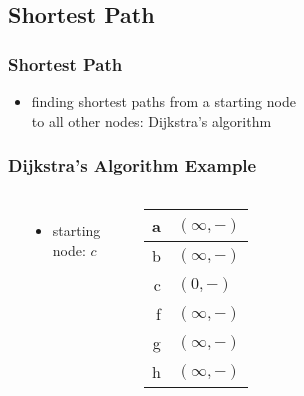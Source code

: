 \documentclass[dvipsnames]{beamer}
\begin{document}
\subsection{Shortest Path}

\begin{frame}
  \frametitle{Shortest Path}

  \begin{itemize}
    \item finding shortest paths from a starting node\\
      to all other nodes:
      Dijkstra's algorithm
  \end{itemize}
\end{frame}

\begin{frame}
  \frametitle{Dijkstra's Algorithm Example}

  \begin{columns}
    \begin{center}
    \end{center}

    \begin{itemize}
      \item starting node: $c$
    \end{itemize}

    \begin{table}
      \begin{tabular}{r|l}
        a & $(\infty,-)$ \\\hline
        b & $(\infty,-)$ \\\hline
        c & $(0,-)$      \\\hline
        f & $(\infty,-)$ \\\hline
        g & $(\infty,-)$ \\\hline
        h & $(\infty,-)$
      \end{tabular}
    \end{table}
  \end{columns}
\end{frame}
\end{document}

